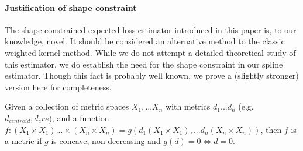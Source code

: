   \newpage
  

\newpage
\paragraph{Justification of shape constraint}

The shape-constrained expected-loss estimator introduced in this paper is, to our knowledge, novel.
It should be considered an alternative method to the classic weighted kernel method.
While we do not attempt a detailed theoretical study of this estimator, we do establish the need for the shape constraint in our spline estimator.
Though this fact is probably well known, we prove a (slightly stronger) version here for completeness.

\begin{proposition}
Given a collection of metric spaces $X_1, ... X_n$ with metrics $d_1 ... d_n$ (e.g. $d_{centroid}, d_cre$), and a function $f: (X_1 \times X_1) ... \times (X_n  \times X_n) = g(d_1(X_1 \times X_1),... d_n(X_n \times X_n))$, then $f$ is a metric if $g$ is concave, non-decreasing and $g(d) = 0 \Longleftrightarrow d = 0$.
\end{proposition}


